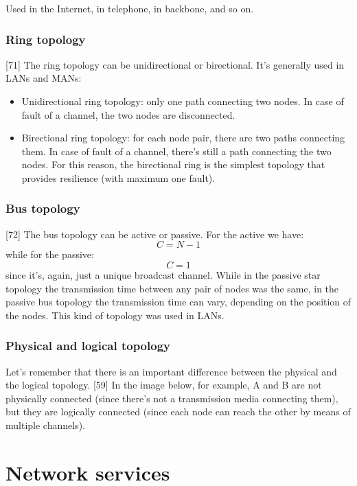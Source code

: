 \noindent Used in the Internet, in telephone, in backbone, and so on.

\subsubsection{Ring topology}
[71]
The ring topology can be unidirectional or birectional. It's generally used in LANs and MANs:
\begin{itemize}
    \item Unidirectional ring topology: only one path connecting two nodes. In case of fault of a channel, the two nodes are disconnected.
    \item Birectional ring topology: for each node pair, there are two paths connecting them. In case of fault of a channel, there's still a path connecting the two nodes. For this reason, the birectional ring is the simplest topology that provides resilience (with maximum one fault).
\end{itemize}

\subsubsection{Bus topology}
[72]
The bus topology can be active or passive. For the active we have:
\[C=N-1\]
\noindent while for the passive:
\[C=1\]
\noindent since it's, again, just a unique broadcast channel. While in the passive star topology the transmission time between any pair of nodes was the same, in the passive bus topology the transmission time can vary, depending on the position of the nodes. This kind of topology was used in LANs.

\subsubsection{Physical and logical topology}
Let's remember that there is an important difference between the physical and the logical topology.
[59]
In the image below, for example, A and B are not physically connected (since there's not a transmission media connecting them), but they are logically connected (since each node can reach the other by means of multiple channels).

\section{Network services}

